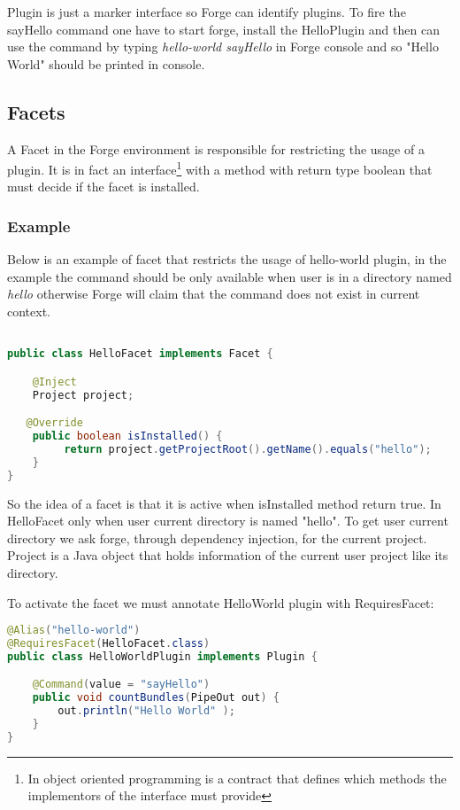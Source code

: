 Plugin is just a marker interface so Forge can identify plugins. To fire the sayHello command one have to start forge, install the HelloPlugin and then can use the command by typing \emph{hello-world sayHello} in Forge console and so "Hello World" should be printed in console.

\subsection{Facets}
\label{sec:forge:facet}
A Facet in the Forge environment is responsible for restricting the usage of a plugin. It is in fact an interface\footnote{In object oriented programming is a contract that defines which methods the implementors of the interface must provide} with a method with return type boolean that must decide if the facet is installed.

\subsubsection{Example}
Below is an example of facet that restricts the usage of hello-world plugin, in the example the command should be only available when user is in a directory named \emph{hello} otherwise Forge will claim that the command does not exist in current context.

\begin{lstlisting}[language=java]

public class HelloFacet implements Facet {

    @Inject 
    Project project;

   @Override
    public boolean isInstalled() {
         return project.getProjectRoot().getName().equals("hello");
    }
}
\end{lstlisting}

So the idea of a facet is that it is active when isInstalled method return true. In HelloFacet only when user current directory is
named "hello". To get user current directory we ask forge, through dependency injection, for the current project. Project is a Java object that holds information of the current user project like its directory. 

To activate the facet we must annotate HelloWorld plugin with RequiresFacet:

\begin{lstlisting}[language=java]
@Alias("hello-world")
@RequiresFacet(HelloFacet.class)
public class HelloWorldPlugin implements Plugin {

    @Command(value = "sayHello")
    public void countBundles(PipeOut out) {
        out.println("Hello World" );
    }
}
\end{lstlisting}

